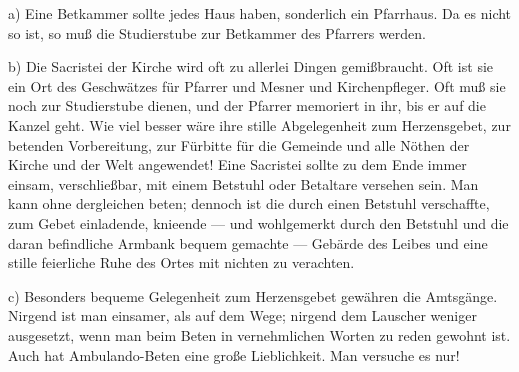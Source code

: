 a) Eine Betkammer sollte jedes Haus haben, sonderlich ein Pfarrhaus. Da es nicht so ist, so muß die Studierstube zur Betkammer des Pfarrers werden.

b) Die Sacristei der Kirche wird oft zu allerlei Dingen gemißbraucht. Oft ist sie ein Ort des Geschwätzes für Pfarrer und Mesner und Kirchenpfleger. Oft muß sie noch zur Studierstube dienen, und der Pfarrer memoriert in ihr, bis er auf die Kanzel geht. Wie viel besser wäre ihre stille Abgelegenheit zum Herzensgebet, zur betenden Vorbereitung, zur Fürbitte für die Gemeinde und alle Nöthen der Kirche und der Welt angewendet! Eine Sacristei sollte zu dem Ende immer einsam, verschließbar, mit einem Betstuhl oder Betaltare versehen sein. Man kann ohne dergleichen beten; dennoch ist die durch einen Betstuhl verschaffte, zum Gebet einladende, knieende — und wohlgemerkt durch den Betstuhl und die daran befindliche Armbank bequem gemachte — Gebärde des Leibes und eine stille feierliche Ruhe des Ortes mit nichten zu verachten.

c) Besonders bequeme Gelegenheit zum Herzensgebet gewähren die Amtsgänge. Nirgend ist man einsamer, als auf dem Wege; nirgend dem Lauscher weniger ausgesetzt, wenn man beim Beten in vernehmlichen Worten zu reden gewohnt ist. Auch hat
Ambulando-Beten eine große Lieblichkeit. Man versuche es nur!

